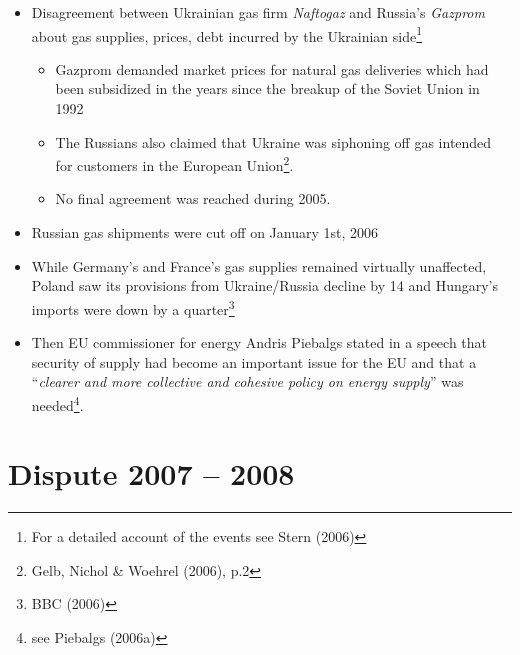 \documentclass[11pt,a4paper,english]{scrreprt}
\begin{document}
\begin{itemize}
	
\item Disagreement between Ukrainian gas firm \emph{Naftogaz} and
Russia's \emph{Gazprom} about gas supplies, prices, debt incurred by the
Ukrainian side\footnote{For a detailed account of the events see Stern (2006)}

  \begin{itemize}
   \item Gazprom demanded market prices for natural gas deliveries which had
been subsidized in the years since the breakup of the Soviet Union in 1992

   \item The Russians also claimed that Ukraine was siphoning off gas intended
for customers in the European Union\footnote{Gelb, Nichol \& Woehrel (2006),
p.2}. 

   \item No final agreement was reached during 2005.

  \end{itemize}


\item Russian gas shipments were cut off on January 1st, 2006


\item While Germany's and France's gas supplies remained virtually unaffected,
Poland saw its provisions from Ukraine/Russia decline by 14\textdiscount{} and
Hungary's imports were down by a quarter\footnote{BBC (2006)}

\item Then EU commissioner for energy Andris Piebalgs stated in a speech that
security of supply had become an important issue for the EU and that a
``\textsl{clearer and more collective and cohesive policy on energy supply}''
was needed\footnote{see Piebalgs (2006a)}.
	


	\end{itemize}


    \section{Dispute 2007 -- 2008}
\end{document}
